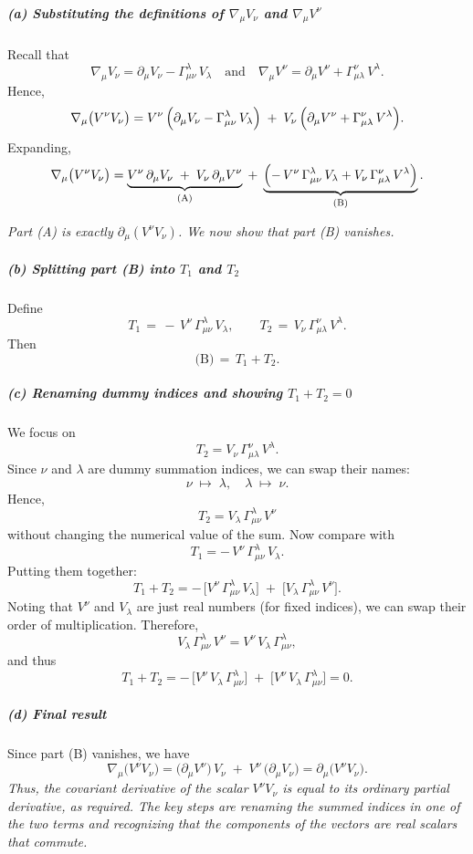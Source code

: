 \subparagraph*{(a) Substituting the definitions of \(\nabla_\mu V_\nu\) and \(\nabla_\mu V^\nu\)}
Recall that
\[
\nabla_\mu V_\nu
=
\partial_\mu V_\nu
-
\Gamma^\lambda_{\mu\nu} \, V_\lambda
\quad\text{and}\quad
\nabla_\mu V^\nu
=
\partial_\mu V^\nu
+
\Gamma^\nu_{\mu\lambda} \, V^\lambda.
\]
Hence,
\[
\nabla_\mu \bigl(V^\nu V_\nu\bigr)
=
V^\nu \,\Bigl(\partial_\mu V_\nu - \Gamma^\lambda_{\mu\nu}\, V_\lambda\Bigr)
\;+\;
V_\nu \,\Bigl(\partial_\mu V^\nu + \Gamma^\nu_{\mu\lambda}\, V^\lambda\Bigr).
\]
Expanding,
\[
\nabla_\mu \bigl(V^\nu V_\nu\bigr)
=
\underbrace{V^\nu \,\partial_\mu V_\nu \;+\; V_\nu \,\partial_\mu V^\nu}_{\text{(A)}}
\;+\;
\underbrace{\Bigl(-\,V^\nu\,\Gamma^\lambda_{\mu\nu}\,V_\lambda + V_\nu\,\Gamma^\nu_{\mu\lambda}\,V^\lambda\Bigr)}_{\text{(B)}}.
\]

\emph{Part (A) is exactly \(\partial_\mu(V^\nu V_\nu)\). We now show that part (B) vanishes.}

\subparagraph*{(b) Splitting part (B) into \(T_1\) and \(T_2\)}
Define
\[
T_1
\,=\,
-\,V^\nu\,\Gamma^\lambda_{\mu\nu}\,V_\lambda,
\qquad
T_2
\,=\,
V_\nu\,\Gamma^\nu_{\mu\lambda}\,V^\lambda.
\]
Then
\[
\text{(B)}
\,=\,
T_1 + T_2.
\]

\subparagraph*{(c) Renaming dummy indices and showing \(T_1 + T_2 = 0\)}
We focus on
\[
T_2
=
V_\nu\,\Gamma^\nu_{\mu\lambda}\,V^\lambda.
\]
Since \(\nu\) and \(\lambda\) are dummy summation indices, we can swap their names:
\[
\nu \;\longmapsto\; \lambda,
\quad
\lambda \;\longmapsto\; \nu.
\]
Hence,
\[
T_2
=
V_\lambda \,\Gamma^\lambda_{\mu\nu}\,V^\nu
\]
without changing the numerical value of the sum. Now compare with
\[
T_1
=
-\,V^\nu \,\Gamma^\lambda_{\mu\nu}\,V_\lambda.
\]
Putting them together:
\[
T_1 + T_2
=
-\,\bigl[V^\nu \,\Gamma^\lambda_{\mu\nu}\,V_\lambda\bigr]
\;+\;
\bigl[V_\lambda \,\Gamma^\lambda_{\mu\nu}\,V^\nu\bigr].
\]
Noting that \(V^\nu\) and \(V_\lambda\) are just real numbers (for fixed indices), we can swap their order of multiplication. Therefore,
\[
V_\lambda \,\Gamma^\lambda_{\mu\nu}\,V^\nu
=
V^\nu\,V_\lambda\,\Gamma^\lambda_{\mu\nu},
\]
and thus
\[
T_1 + T_2
=
-\,\bigl[V^\nu\,V_\lambda\,\Gamma^\lambda_{\mu\nu}\bigr]
\;+\;
\bigl[V^\nu\,V_\lambda\,\Gamma^\lambda_{\mu\nu}\bigr]
=
0.
\]

\subparagraph*{(d) Final result}
Since part (B) vanishes, we have
\[
\nabla_\mu \bigl(V^\nu V_\nu\bigr)
=
\bigl(\partial_\mu V^\nu\bigr)\,V_\nu
\;+\;
V^\nu\,\bigl(\partial_\mu V_\nu\bigr)
=
\partial_\mu \bigl(V^\nu V_\nu\bigr).
\]
\emph{Thus, the covariant derivative of the scalar \(V^\nu V_\nu\) is equal to its ordinary partial derivative, as required. The key steps are renaming the summed indices in one of the two terms and recognizing that the components of the vectors are real scalars that commute.}
    
